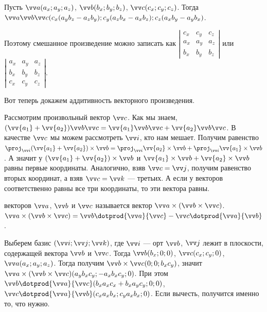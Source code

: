 \documentclass{article}
\let\vec\vv
\begin{document}
\begin{itemize}
\begin{Comment}
        \end{Comment}
        \thm Пусть $\vec a(a_x;a_y;a_z)$, $\vec b(b_x;b_y;b_z)$, $\vec c(c_x;c_y;c_z)$. Тогда $\vec a\vec b\vec c(c_x(a_yb_z-a_zb_y);c_y(a_zb_x-a_xb_z);c_z(a_xb_y-a_yb_x)$.
        \begin{Comment}
            Поэтому смешанное произведение можно записать как $\left|\begin{matrix}
                c_x & c_y & c_z\\
                a_x & a_y & a_z\\
                b_x & b_y & b_z
            \end{matrix}\right|$ или $\left|\begin{matrix}
                a_x & a_y & a_z\\
                b_x & b_y & b_z\\
                c_x & c_y & c_z
            \end{matrix}\right|$.
        \end{Comment}
        \thm  Вот теперь докажем аддитивность векторного произведения.
        \begin{Proof}
            Рассмотрим произвольный вектор $\vec c$. Как мы знаем, $(\vec{a_1}+\vec{a_2})\vec b\vec c=\vec{a_1}\vec b\vec c+\vec{a_2}\vec b\vec c$. В качестве $\vec c$ мы можем рассмотреть $\vec i$, кто нам мешает. Получим равенство $\proj_{\vec i}(\vec{a_1}+\vec{a_2})\times\vec b=\proj_{\vec i}\vec{a_2}\times\vec b+\proj_{\vec i}\vec{a_1}\times\vec b$. А значит у $(\vec{a_1}+\vec{a_2})\times\vec b$ и $\vec{a_1}\times\vec b+\vec{a_2}\times\vec b$ равны первые координаты. Аналогично, взяв $\vec c=\vec j$, получим равенство вторых координат, а взяв $\vec c=\vec k$ --- третьих. А если у векторов соответственно равны все три координаты, то эти вектора равны.
        \end{Proof}
        \dfn {} векторов $\vec a$, $\vec b$ и $\vec c$ называется вектор $\vec a\times(\vec b\times\vec c)$.
        \thm $\vec a\times(\vec b\times\vec c)=\vec b\dotprod{\vec a}{\vec c}-\vec c\dotprod{\vec a}{\vec b}$.
        \begin{Proof}
            Выберем базис $(\vec i;\vec j;\vec k)$, где $\vec i$ --- орт $\vec b$, $\vec j$ лежит в плоскости, содержащей вектора $\vec b$ и $\vec c$. Тогда $\vec b(b_x;0;0)$, $\vec c(c_x;c_y;0)$, $\vec a(a_x;a_y;a_z)$. Тогда получим $\vec b\times\vec c(0;0;b_xc_y)$, значит $\vec a\times(\vec b\times\vec c)(a_yb_xc_y;-a_xb_xc_y;0)$. При этом $\vec b\dotprod{\vec a}{\vec c}(b_xa_xc_x+b_xa_yc_y;0;0)$, $\vec c\dotprod{\vec a}{\vec b}(c_xa_xb_x;c_ya_xb_x;0)$. Если вычесть, получится именно то, что нужно.
        \end{Proof}
    \end{itemize}
\end{document}
